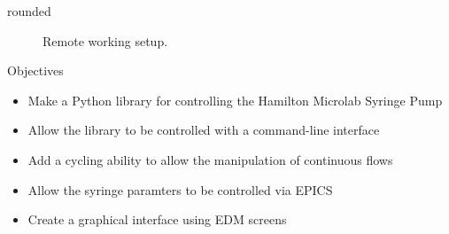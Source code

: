 \documentclass[a0paper,landscape,fontscale=0.35]{baposter}
\begin{document}
\begin{poster}
\begin{posterbox}[name=remotework,column=0,headerfont={},headershape=rounded,boxheaderheight=0em,boxColorOne=white,borderColor=white,below=introduction]{rounded}
\begin{figure}[H]
\begin{center}
\caption{Remote working setup. }
\vspace{-1.2em}
\end{center}
\end{figure}
\end{posterbox}
\begin{posterbox}[name=objectives,column=0,row=0,below=remotework]{Objectives}
 \begin{itemize}
    \item Make a Python library for controlling the Hamilton Microlab Syringe Pump
    \item Allow the library to be controlled with a command-line interface
    \item Add a cycling ability to allow the manipulation of continuous flows
    \item Allow the syringe paramters to be controlled via EPICS
    \item Create a graphical interface using EDM screens
\end{itemize}
\end{posterbox}


\end{poster}
\end{document}
